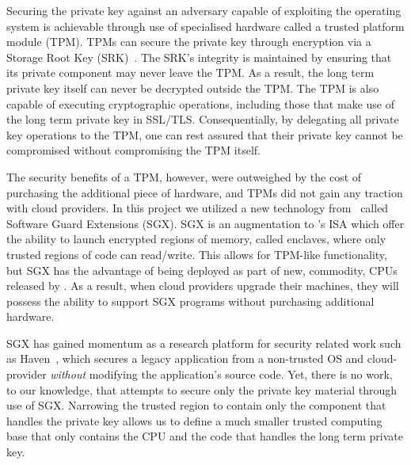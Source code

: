 \documentclass[../main.tex]{subfiles}
\begin{document}
Securing the private key against an adversary capable of exploiting
the operating system is achievable through use of specialised hardware
called a trusted platform module (TPM). TPMs can secure the private
key through encryption via a Storage Root Key (SRK)~\cite{tpm10}. The
SRK's integrity is maintained by ensuring that its private component
may never leave the TPM. As a result, the long term private key itself
can never be decrypted outside the TPM. The TPM is also capable of
executing cryptographic operations, including those that make use of
the long term private key in SSL/TLS. Consequentially, by delegating
all private key operations to the TPM, one can rest assured that their
private key cannot be compromised without compromising the TPM itself.

The security benefits of a TPM, however, were outweighed by the cost
of purchasing the additional piece of hardware, and TPMs did not gain
any traction with cloud providers. In this project we utilized a new
technology from \Intel~called Software Guard Extensions (SGX). SGX is
an augmentation to \Intel's ISA which offer the ability to launch
encrypted regions of memory, called enclaves, where only trusted
regions of code can read/write. This allows for TPM-like
functionality, but SGX has the advantage of being deployed as part of
new, commodity, CPUs released by \Intel. As a result, when cloud providers
upgrade their machines, they will possess the ability to support SGX
programs without purchasing additional hardware.

SGX has gained momentum as a research platform for security related
work such as Haven~\cite{Baumann14}, which secures a legacy application
from a non-trusted OS and cloud-provider \textit{without} modifying
the application's source code.  Yet, there is no work, to our
knowledge, that attempts to secure only the private key material
through use of SGX. Narrowing the trusted region to contain only the
component that handles the private key allows us to define a much
smaller trusted computing base that only contains the CPU and the code
that handles the long term private key. 
\end{document}
